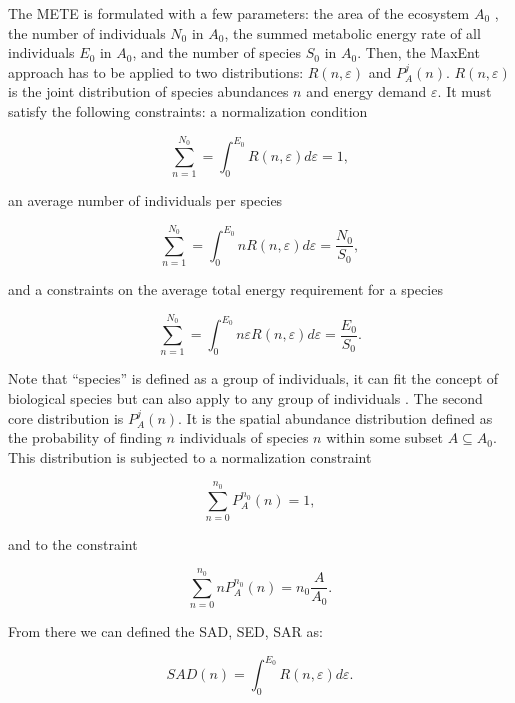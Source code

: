 \documentclass[letterpaper,12pt]{article}
\begin{document}
The METE is formulated with a few parameters: the area of the ecosystem $A_0$
, the number of individuals $N_0$ in $A_0$, the summed metabolic energy rate
of all individuals $E_0$ in $A_0$, and the number of species $S_0$ in $A_0$.
Then, the MaxEnt approach has to be applied to two distributions: $R(n,
\varepsilon)$ and $P_A^{j}(n)$. $R(n, \varepsilon)$ is the joint distribution of
species abundances $n$ and energy demand $\varepsilon$. It must satisfy the
following constraints: a normalization condition

\begin{equation}\label{rne-const1}
  \sum_{n = 1}^{N_0} = \int_0^{E_0}R(n, \varepsilon)d\varepsilon = 1,
\end{equation}

an average number of individuals per species

\begin{equation}\label{rne-const2}
  \sum_{n = 1}^{N_0} = \int_0^{E_0} nR(n, \varepsilon)d\varepsilon = \frac{N_0}{S_0},
\end{equation}

and a constraints on the average total energy requirement for a species

\begin{equation}\label{rne-const3}
  \sum_{n = 1}^{N_0} = \int_0^{E_0}n\varepsilon R(n, \varepsilon)d\varepsilon = \frac{E_0}{S_0}.
\end{equation}

Note that ``species'' is defined as a group of individuals, it can fit the
concept of biological species but can also apply to any group of individuals
\cite{coy04,har11b}. The second core distribution is $P_A^{j}(n)$. It is the
spatial abundance distribution defined as the probability of finding $n$
individuals of species $n$ within some subset $A \subseteq A_0$. This
distribution is subjected to a normalization constraint

\begin{equation}
  \sum_{n = 0}^{n_0} P^{n_0}_A(n) = 1,
\end{equation}

and to the constraint

\begin{equation}
  \sum_{n = 0}^{n_0} nP^{n_0}_A(n) = n_0\frac{A}{A_0}.
\end{equation}

From there we can defined the SAD, SED, SAR as:

\begin{equation}\label{eq-dist-1}
  SAD(n) = \int_0^{E_0} R(n, \varepsilon)d\varepsilon.
\end{equation}
\end{document}
